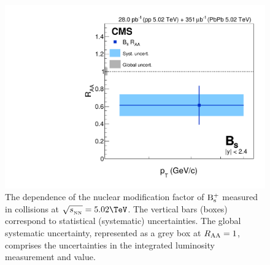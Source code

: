 \begin{figure}[tb]
\centering
\includegraphics[width=\cmsFigWidth]{plots/canvasRAAPbPb_0_100.pdf}
\caption{The \pt dependence of the nuclear modification factor \RAA of $\rm B_{\rm s }^{+}$ measured in \PbPb collisions at $\sqrtsNN=5.02\TeV$. The vertical bars (boxes) correspond to statistical (systematic) uncertainties.
The global systematic uncertainty, represented as a grey box at $R_{\mathrm{AA}}=1$, comprises the uncertainties in the integrated luminosity measurement and \TAA value. }
\label{fig:rpaall}
\end{figure}


